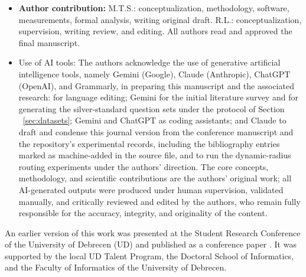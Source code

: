 \documentclass[pdflatex,sn-mathphys-num]{sn-jnl}
\theoremstyle{thmstyleone}%
\theoremstyle{thmstylethree}%
\begin{document}
\begin{itemize}
\item \textbf{Author contribution:}  M.T.S.: conceptualization, methodology, software, measurements, formal analysis, writing original draft. R.L.: conceptualization, supervision, writing review, and editing. All authors read and approved the final manuscript.
\item Use of AI tools: The authors acknowledge the use of generative artificial intelligence tools, namely Gemini (Google), Claude (Anthropic), ChatGPT (OpenAI), and Grammarly, in preparing this manuscript and the associated research: for language editing; Gemini for the initial literature survey and for generating the silver-standard question sets under the protocol of Section ~\ref{sec:datasets}; Gemini and ChatGPT as coding assistants; and Claude to draft and condense this journal version from the conference manuscript and the repository's experimental records, including the bibliography entries marked as machine-added in the source file, and to run the dynamic-radius routing experiments under the authors' direction. The core concepts, methodology, and scientific contributions are the authors' original work; all AI-generated outputs were produced under human supervision, validated manually, and critically reviewed and edited by the authors, who remain fully responsible for the accuracy, integrity, and originality of the content.
\end{itemize}

An earlier version of this work was presented at the Student Research Conference of the University of Debrecen (UD) and published as a conference paper \cite{sandor2025documentslicecontextualretrieval}. It was supported by the local UD Talent Program, the Doctoral School of Informatics, and the Faculty of Informatics of the University of Debrecen.


\end{document}
